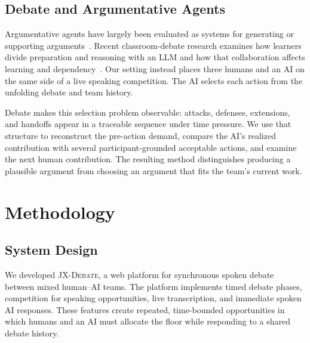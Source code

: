 \documentclass[manuscript,review,anonymous]{acmart}
\begin{document}
\subsection{Debate and Argumentative Agents}
Argumentative agents have largely been evaluated as systems for generating or supporting arguments~\cite{hadfi2021argumentative}. Recent classroom-debate research examines how learners divide preparation and reasoning with an LLM and how that collaboration affects learning and dependency~\cite{zhang2025debate}. Our setting instead places three humans and an AI on the same side of a live speaking competition. The AI selects each action from the unfolding debate and team history.

Debate makes this selection problem observable: attacks, defenses, extensions, and handoffs appear in a traceable sequence under time pressure. We use that structure to reconstruct the pre-action demand, compare the AI's realized contribution with several participant-grounded acceptable actions, and examine the next human contribution. The resulting method distinguishes producing a plausible argument from choosing an argument that fits the team's current work.

\section{Methodology}

\subsection{System Design}

We developed \textsc{JX-Debate}, a web platform for synchronous spoken debate between mixed human--AI teams. The platform implements timed debate phases, competition for speaking opportunities, live transcription, and immediate spoken AI responses. These features create repeated, time-bounded opportunities in which humans and an AI must allocate the floor while responding to a shared debate history.
\end{document}
